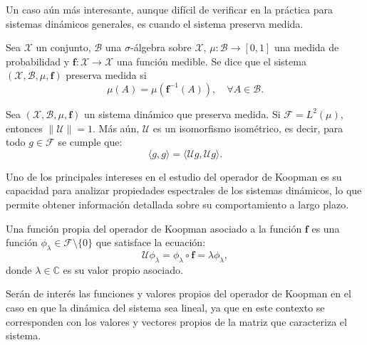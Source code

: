 Un caso aún más interesante, aunque difícil de verificar en la práctica para sistemas dinámicos generales, es cuando el sistema preserva medida.

\begin{defn}
    Sea $\mathcal{X}$ un conjunto, $\mathcal{B}$ una $\sigma$-álgebra sobre $\mathcal{X}$, $\mu: \mathcal{B} \to [0, 1]$ una medida de probabilidad y $\mathbf{f}: \mathcal{X} \to \mathcal{X}$ una función medible. Se dice que el sistema $(\mathcal{X}, \mathcal{B}, \mu, \mathbf{f})$ preserva medida si 
    \begin{equation*}
        \mu(A) = \mu(\mathbf{f}^{-1}(A)), \quad \forall A \in \mathcal{B}.
    \end{equation*}
\end{defn}

\begin{prop}
    Sea $(\mathcal{X}, \mathcal{B}, \mu, \mathbf{f})$ un sistema dinámico que preserva medida. Si $\mathcal{F} = L^2 (\mu)$, entonces $\|\mathcal{U}\| = 1$. Más aún, $\mathcal{U}$ es un isomorfismo isométrico, es decir, para todo $g \in \mathcal{F}$ se cumple que:
    \begin{equation*}
        \langle g, g \rangle = \langle \mathcal{U}g, \mathcal{U}g \rangle.
    \end{equation*}
\end{prop}

Uno de los principales intereses en el estudio del operador de Koopman es su capacidad para analizar propiedades espectrales de los sistemas dinámicos, lo que permite obtener información detallada sobre su comportamiento a largo plazo.

\begin{defn}
    Una función propia del operador de Koopman asociado a la función $\mathbf{f}$ es una función $\phi_\lambda \in \mathcal{F} \setminus \{ 0 \}$ que satisface la ecuación:
    \begin{equation*}
        \mathcal{U} \phi_\lambda = \phi_\lambda \circ \mathbf{f} = \lambda \phi_\lambda,
    \end{equation*}
    donde $\lambda \in \mathbb{C}$ es su valor propio asociado.
\end{defn}

Serán de interés las funciones y valores propios del operador de Koopman en el caso en que la dinámica del sistema sea lineal, ya que en este contexto se corresponden con los valores y vectores propios de la matriz que caracteriza el sistema.

